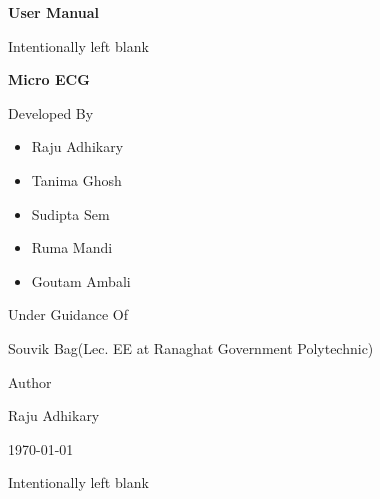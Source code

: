 \documentclass[twoside]{article}
\begin{document}
\begin{titlepage}
    \centering
    \vspace*{3cm}
    
    {\Huge \bfseries User Manual \par}
    \vspace{2cm}
    
    \newpage
    Intentionally left blank
    \thispagestyle{empty}
    \newpage
    
    {\Large \bfseries Micro ECG\par}
    \vspace{1cm}
    
    {\Large Developed By\par}
    
    \begin{center}
        \begin{itemize}[leftmargin=3cm]
              \item Raju Adhikary
              \item Tanima Ghosh
              \item Sudipta Sem
              \item Ruma Mandi
              \item Goutam Ambali
        \end{itemize}
    \end{center}
    
    \vfill
    
    {\Large Under Guidance Of\par}
    {\large Souvik Bag(Lec. EE at Ranaghat Government Polytechnic)\par}
    \vfill
    
    {\small Author\par}
    {\small Raju Adhikary\par}
    {\small \today\par}
\end{titlepage}



\vspace{-2em}

\newpage
Intentionally left blank
\thispagestyle{empty}
\newpage

\tableofcontents

\newpage
\end{document}
